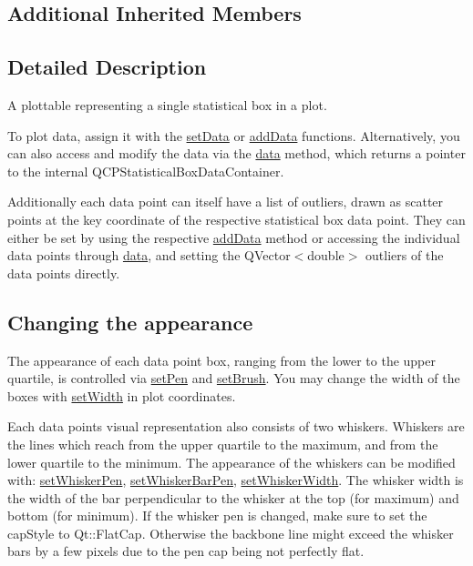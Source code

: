 \subsection*{Additional Inherited Members}


\subsection{Detailed Description}
A plottable representing a single statistical box in a plot. 



To plot data, assign it with the \hyperlink{class_q_c_p_statistical_box_a08a6da55822bad825ee25a8069b9b52f}{set\+Data} or \hyperlink{class_q_c_p_statistical_box_a9a8739c5b8291db8fd839e892fc8f478}{add\+Data} functions. Alternatively, you can also access and modify the data via the \hyperlink{class_q_c_p_statistical_box_a728e501413eaf191544014173d52dfbc}{data} method, which returns a pointer to the internal Q\+C\+P\+Statistical\+Box\+Data\+Container.

Additionally each data point can itself have a list of outliers, drawn as scatter points at the key coordinate of the respective statistical box data point. They can either be set by using the respective \hyperlink{class_q_c_p_statistical_box_a026f2790b530d6f29312254ecb1e7c1e}{add\+Data} method or accessing the individual data points through \hyperlink{class_q_c_p_statistical_box_a728e501413eaf191544014173d52dfbc}{data}, and setting the {\ttfamily Q\+Vector$<$double$>$ outliers} of the data points directly.\hypertarget{class_q_c_p_statistical_box_qcpstatisticalbox-appearance}{}\subsection{Changing the appearance}\label{class_q_c_p_statistical_box_qcpstatisticalbox-appearance}
The appearance of each data point box, ranging from the lower to the upper quartile, is controlled via \hyperlink{class_q_c_p_abstract_plottable_ab74b09ae4c0e7e13142fe4b5bf46cac7}{set\+Pen} and \hyperlink{class_q_c_p_abstract_plottable_a7a4b92144dca6453a1f0f210e27edc74}{set\+Brush}. You may change the width of the boxes with \hyperlink{class_q_c_p_statistical_box_a0b62775bd67301b1eba5c785f2b26f14}{set\+Width} in plot coordinates.

Each data point\textquotesingle{}s visual representation also consists of two whiskers. Whiskers are the lines which reach from the upper quartile to the maximum, and from the lower quartile to the minimum. The appearance of the whiskers can be modified with\+: \hyperlink{class_q_c_p_statistical_box_a4a5034cb3b9b040444df05ab1684620b}{set\+Whisker\+Pen}, \hyperlink{class_q_c_p_statistical_box_aa8d3e503897788e1abf68dc74b5f147f}{set\+Whisker\+Bar\+Pen}, \hyperlink{class_q_c_p_statistical_box_adf378812446bd66f34d1f7f293d991cd}{set\+Whisker\+Width}. The whisker width is the width of the bar perpendicular to the whisker at the top (for maximum) and bottom (for minimum). If the whisker pen is changed, make sure to set the {\ttfamily cap\+Style} to {\ttfamily Qt\+::\+Flat\+Cap}. Otherwise the backbone line might exceed the whisker bars by a few pixels due to the pen cap being not perfectly flat.

